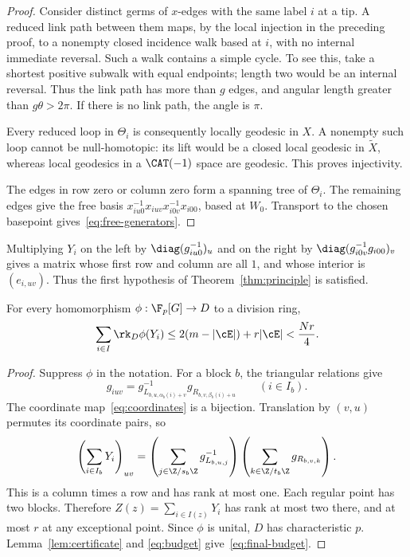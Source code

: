 \begin{proof}
Consider distinct germs of \(x\)-edges with the same label \(i\) at
a tip. A reduced link path between them maps, by the local injection
in the preceding proof, to a nonempty closed incidence walk based at
\(i\), with no internal immediate reversal. Such a walk contains a
simple cycle. To see this, take a shortest positive subwalk with equal
endpoints; length two would be an internal reversal. Thus the link
path has more than \(g\) edges, and angular length greater than
\(g\theta>2\pi\). If there is no link path, the angle is \(\pi\).

Every reduced loop in \(\Theta_i\) is consequently locally geodesic
in \(X\). A nonempty such loop cannot be null-homotopic: its lift
would be a closed local geodesic in \(\widetilde X\), whereas local
geodesics in a \(\CAT(-1)\) space are geodesic.
This proves injectivity.

The edges in row zero or column zero form a spanning tree of
\(\Theta_i\). The remaining edges give the free basis
\(x_{iu0}^{-1}x_{iuv}x_{i0v}^{-1}x_{i00}\), based at \(W_0\).
Transport to the chosen basepoint gives~\eqref{eq:free-generators}.
\end{proof}

Multiplying \(Y_i\) on the left by
\(\diag(g_{iu0}^{-1})_u\) and on the right by
\(\diag(g_{i0v}^{-1}g_{i00})_v\) gives a matrix whose first row and
column are all \(1\), and whose interior is \((e_{i,uv})\).
Thus the first hypothesis of Theorem~\ref{thm:principle} is satisfied.

\begin{proposition}\label{prop:rank-budget}
For every homomorphism \(\phi:\F_p[G]\to D\) to a division ring,
\begin{equation}\label{eq:final-budget}
 \sum_{i\in I}\rk_D\phi(Y_i)
 \le 2(m-|\cE|)+r|\cE|<\frac{Nr}{4}.
\end{equation}
\end{proposition}

\begin{proof}
Suppress \(\phi\) in the notation. For a block \(b\), the triangular
relations give
\[
 g_{iuv}=g_{L_{b,u,\alpha_b(i)+v}}^{-1}
          g_{R_{b,v,\beta_b(i)+u}}\qquad(i\in I_b).
\]
The coordinate map~\eqref{eq:coordinates} is a bijection. Translation
by \((v,u)\) permutes its coordinate pairs, so
\begin{equation}\label{eq:block-factor}
 \left(\sum_{i\in I_b}Y_i\right)_{uv}
 =\left(\sum_{j\in\Z/s_b\Z}g_{L_{b,u,j}}^{-1}\right)
  \left(\sum_{k\in\Z/t_b\Z}g_{R_{b,v,k}}\right).
\end{equation}
This is a column times a row and has rank at most one.
Each regular point has two blocks. Therefore
\(Z(z)=\sum_{i\in I(z)}Y_i\) has rank at most two there, and at most
\(r\) at any exceptional point. Since \(\phi\) is unital, \(D\) has
characteristic \(p\). Lemma~\ref{lem:certificate} and
\eqref{eq:budget} give~\eqref{eq:final-budget}.
\end{proof}

